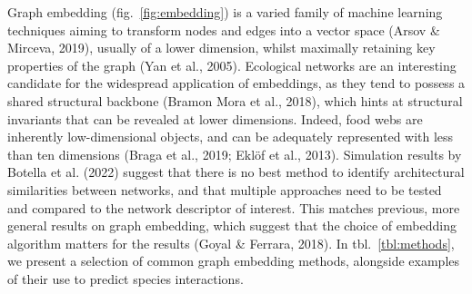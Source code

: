 \documentclass[11pt]{article}
\begin{document}
Graph embedding (fig.~\ref{fig:embedding}) is a varied family of machine
learning techniques aiming to transform nodes and edges into a vector
space (Arsov \& Mirceva, 2019), usually of a lower dimension, whilst
maximally retaining key properties of the graph (Yan et al., 2005).
Ecological networks are an interesting candidate for the widespread
application of embeddings, as they tend to possess a shared structural
backbone (Bramon Mora et al., 2018), which hints at structural
invariants that can be revealed at lower dimensions. Indeed, food webs
are inherently low-dimensional objects, and can be adequately
represented with less than ten dimensions (Braga et al., 2019; Eklöf et
al., 2013). Simulation results by Botella et al. (2022) suggest that
there is no best method to identify architectural similarities between
networks, and that multiple approaches need to be tested and compared to
the network descriptor of interest. This matches previous, more general
results on graph embedding, which suggest that the choice of embedding
algorithm matters for the results (Goyal \& Ferrara, 2018). In
tbl.~\ref{tbl:methods}, we present a selection of common graph embedding
methods, alongside examples of their use to predict species
interactions.
\end{document}
